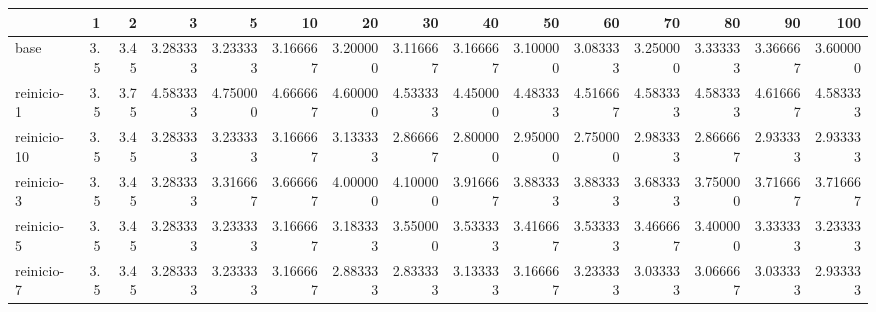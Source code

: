 \begin{tabular}{lrrrrrrrrrrrrrr}
\toprule
{} &  1   &   2   &       3   &       5   &       10  &       20  &       30  &       40  &       50  &       60  &       70  &       80  &       90  &       100 \\
\midrule
base        &  3.5 &  3.45 &  3.283333 &  3.233333 &  3.166667 &  3.200000 &  3.116667 &  3.166667 &  3.100000 &  3.083333 &  3.250000 &  3.333333 &  3.366667 &  3.600000 \\
reinicio-1  &  3.5 &  3.75 &  4.583333 &  4.750000 &  4.666667 &  4.600000 &  4.533333 &  4.450000 &  4.483333 &  4.516667 &  4.583333 &  4.583333 &  4.616667 &  4.583333 \\
reinicio-10 &  3.5 &  3.45 &  3.283333 &  3.233333 &  3.166667 &  3.133333 &  2.866667 &  2.800000 &  2.950000 &  2.750000 &  2.983333 &  2.866667 &  2.933333 &  2.933333 \\
reinicio-3  &  3.5 &  3.45 &  3.283333 &  3.316667 &  3.666667 &  4.000000 &  4.100000 &  3.916667 &  3.883333 &  3.883333 &  3.683333 &  3.750000 &  3.716667 &  3.716667 \\
reinicio-5  &  3.5 &  3.45 &  3.283333 &  3.233333 &  3.166667 &  3.183333 &  3.550000 &  3.533333 &  3.416667 &  3.533333 &  3.466667 &  3.400000 &  3.333333 &  3.233333 \\
reinicio-7  &  3.5 &  3.45 &  3.283333 &  3.233333 &  3.166667 &  2.883333 &  2.833333 &  3.133333 &  3.166667 &  3.233333 &  3.033333 &  3.066667 &  3.033333 &  2.933333 \\
\bottomrule
\end{tabular}
